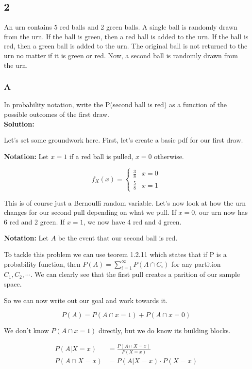 \subsection*{2}

An urn contains 5 red balls and 2 green balls. A single ball is randomly drawn from the urn. If the ball is green, then a red ball is added to the urn. If the ball is red, then a green ball is added to the urn. The original ball is not returned to the urn no matter if it is green or red. Now, a second ball is randomly drawn from the urn.

\subsubsection*{A}

In probability notation, write the P(second ball is red) as a function of the possible outcomes of the first draw. \\

\noindent \textbf{Solution:}

Let's set some groundwork here. First, let's create a basic pdf for our first draw.

\noindent \textbf{Notation:} Let $x=1$ if a red ball is pulled, $x=0$ otherwise.

\[
	f_X(x) = \begin{cases} 
		\frac{3}{8} & x=0 \\
		\frac{5}{8} & x=1
	\end{cases}
\]

This is of course just a Bernoulli random variable. Let's now look at how the urn changes for our second pull depending on what we pull. If $x=0$, our urn now has 6 red and 2 green. If $x=1$, we now have 4 red and 4 green. 

\noindent \textbf{Notation:} Let $A$ be the event that our second ball is red. 

To tackle this problem we can use teorem 1.2.11 which states that if P is a probability function, then $P(A) = \sum_{i=1}^{\infty} P(A \cap C_i)$ for any partition $C_1, C_2, \cdots$. We can clearly see that the first pull creates a parition of our sample space. 

So we can now write out our goal and work towards it.

\[P(A) = P(A \cap x=1) + P(A \cap x=0)\]

We don't know $P(A \cap x=1)$ directly, but we do know its building blocks. 

	\begin{align*}
		P(A|X=x) &= \frac{P(A \cap X=x)}{P(X=x)} \\
		P(A \cap X=x) &= P(A | X=x) \cdot P(X=x)
	\end{align*}

